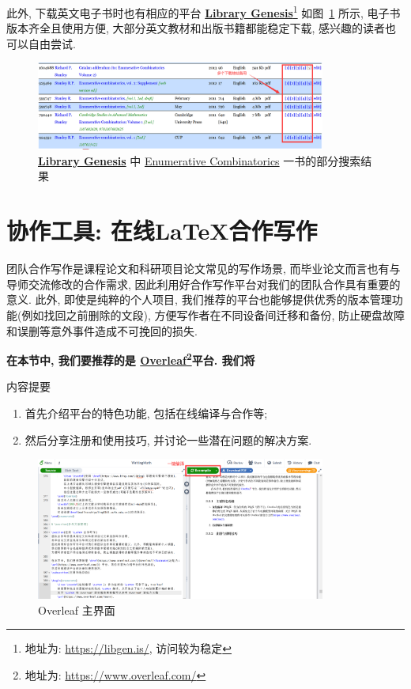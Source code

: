 \documentclass{booki}
\begin{document}
此外, 下载英文电子书时也有相应的平台 \textbf{\href{https://libgen.is/}{Library Genesis}}\footnote{地址为: \url{https://libgen.is/}, 访问较为稳定} 如图~\ref{fig:libgen} 所示, 电子书版本齐全且使用方便, 大部分英文教材和出版书籍都能稳定下载, 感兴趣的读者也可以自由尝试.
\begin{figure}[H]
    \centering
    \includegraphics[width=0.85\textwidth]{figure/ec.png}
    \caption{\textbf{\href{https://libgen.is/}{Library Genesis}} 中 \href{https://libgen.is/search.php?&req=Enumerative+Combinatorics&phrase=1&view=simple&column=def&sort=year&sortmode=DESC}{Enumerative Combinatorics} 一书的部分搜索结果}
    \label{fig:libgen}
\end{figure}

\section{协作工具: 在线\LaTeX 合作写作}
团队合作写作是课程论文和科研项目论文常见的写作场景, 而毕业论文而言也有与导师交流修改的合作需求, 因此利用好合作写作平台对我们的团队合作具有重要的意义. 此外, 即使是纯粹的个人项目, 我们推荐的平台也能够提供优秀的版本管理功能(例如找回之前删除的文段), 方便写作者在不同设备间迁移和备份, 防止硬盘故障和误删等意外事件造成不可挽回的损失.

\textbf{在本节中, 我们要推荐的是 \href{https://www.overleaf.com/}{Overleaf}\footnote{地址为: \url{https://www.overleaf.com/}}平台. 我们将}

\begin{titledBox}{内容提要}
\begin{enumerate}
    \item 首先介绍平台的特色功能, 包括在线编译与合作等;
    \item 然后分享注册和使用技巧, 并讨论一些潜在问题的解决方案.
\end{enumerate}
\end{titledBox}

\begin{figure}[H]
    \centering
    \includegraphics[width=0.85\textwidth]{figure/overleafMain.png}
    \caption{Overleaf 主界面}
    \label{fig:overleafMain}
\end{figure}
\end{document}
